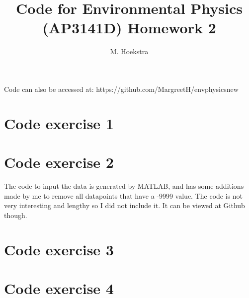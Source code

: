 \documentclass[11pt]{article} %
\title{Code for Environmental Physics (AP3141D) Homework 2}
\author{M. Hoekstra}
\begin{document}
\maketitle

Code can also be accessed at:
https://github.com/MargreetH/envphysicsnew


\section{Code exercise 1}



\section{Code exercise 2}

The code to input the data is generated by MATLAB, and has some additions made by me to remove all datapoints that have a -9999 value. The code is not very interesting and lengthy so I did not include it. It can be viewed at Github though.




\section{Code exercise 3}



\section{Code exercise 4}










\end{document}

